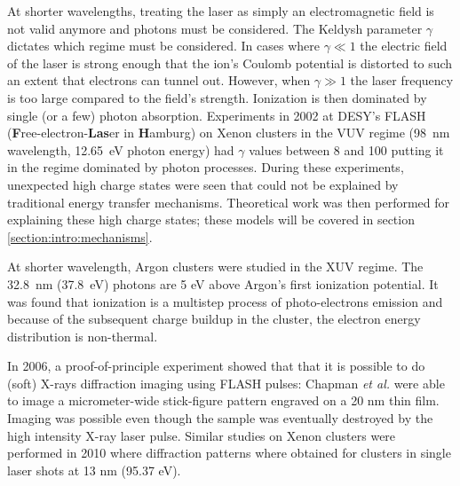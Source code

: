 At shorter wavelengths, treating the laser as simply an electromagnetic field
is not valid anymore and photons must be considered.
The Keldysh parameter $\gamma$ dictates which regime must be considered. In
cases where $\gamma \ll 1$ the electric field of the laser is strong enough that
the ion's Coulomb potential is distorted to such an extent
that electrons can tunnel out.
However, when $\gamma \gg 1$ the laser frequency is too large compared to the
field's strength. Ionization is then dominated by single (or a few) photon
absorption.
%
%
Experiments in
2002\cite{Wabnitz2002,Bostedt2009} at
DESY's FLASH (\textbf{F}ree-electron-\textbf{Las}er in \textbf{H}amburg)
on Xenon clusters in the VUV regime (98~nm wavelength, 12.65~eV photon energy)
had $\gamma$ values between 8 and
100 putting it in the regime dominated by photon processes.
During these experiments, unexpected high charge states were seen that could not
be explained by traditional energy transfer mechanisms. Theoretical work was
then performed for explaining these high charge states; these models will be
covered in section \ref{section:intro:mechanisms}.



At shorter wavelength,
Argon clusters were studied in the XUV regime\cite{Bostedt2008}. The 32.8~nm
(37.8~eV) photons are 5 eV above Argon's first ionization
potential. It was found that ionization is a multistep process of
photo-electrons emission and because of the subsequent charge buildup in the
cluster, the electron energy distribution is non-thermal.

In 2006, a proof-of-principle experiment showed that that it is possible to
do (soft) X-rays diffraction imaging using FLASH pulses\cite{Chapman2006}:
Chapman \textit{et al.} were able to image a micrometer-wide stick-figure pattern
engraved on a 20 nm thin film. Imaging was possible even though the sample was
eventually destroyed by the high intensity X-ray laser pulse.
Similar studies on Xenon clusters were performed in 2010\cite{Bostedt2010} where
diffraction patterns where obtained for clusters in single laser shots
at 13 nm (95.37 eV).

